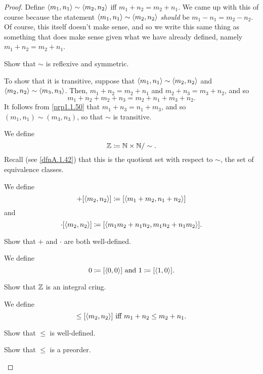 \begin{thm}[Integers]
\begin{savenotes}
\begin{proof}
Define $\langle m_1,n_1\rangle\sim \langle m_2,n_2\rangle$ iff $m_1+n_2=m_2+n_1$.  We came up with this of course because the statement $\langle m_1,n_1\rangle\sim \langle m_2,n_2\rangle$ \emph{should} be $m_1-n_1=m_2-n_2$.  Of course, this itself doesn't make sense, and so we write this same thing as something that does make sense given what we have already defined, namely $m_1+n_2=m_2+n_1$.

\begin{exr}
Show that $\sim$ is reflexive and symmetric.
\end{exr}
To show that it is transitive, suppose that $\langle m_1,n_1\rangle\sim \langle m_2,n_2\rangle$ and $\langle m_2,n_2\rangle\sim \langle m_3,n_3\rangle$.  Then, $m_1+n_2=m_2+n_1$ and $m_2+n_3=m_3+n_2$, and so
\begin{equation}
m_1+n_2+m_2+n_3=m_2+n_1+m_3+n_2.
\end{equation}
It follows from \cref{prp1.1.50} that $m_1+n_3=n_1+m_3$, and so $(m_1,n_1)\sim (m_3,n_3)$, so that $\sim$ is transitive.

We define
\begin{equation}
\mathbb{Z} \coloneqq \mathbb{N} \times \mathbb{N} /\sim .
\end{equation}
Recall (see \cref{dfnA.1.42}) that this is the quotient set with respect to $\sim$, the set of equivalence classes.

We define
\begin{equation}
[\coord{m_1,n_1}]+[\coord{m_2,n_2}]\coloneqq [\coord{m_1+m_2,n_1+n_2}]
\end{equation}
and
\begin{equation}
[\coord{m_1,n_1}]\cdot [\coord{m_2,n_2}]\coloneqq [\coord{m_1m_2+n_1n_2,m_1n_2+n_1m_2}].
\end{equation}
\begin{exr}
Show that $+$ and $\cdot$ are both well-defined.
\end{exr}

We define
\begin{equation}
0\coloneqq [\langle0,0\rangle]\text{ and }1\coloneqq [\langle1,0\rangle].
\end{equation}

\begin{exr}
Show that $\mathbb{Z}$ is an integral cring.
\end{exr}

We define
\begin{equation}
[\coord{m_1,n_1}]\leq [\coord{m_2,n_2}]\text{ iff }m_1+n_2\leq m_2+n_1.
\end{equation}
\begin{exr}
Show that $\leq$ is well-defined.
\end{exr}
\begin{exr}
Show that $\leq$ is a preorder.
\end{exr}


\end{proof}
\end{savenotes}
\end{thm}
